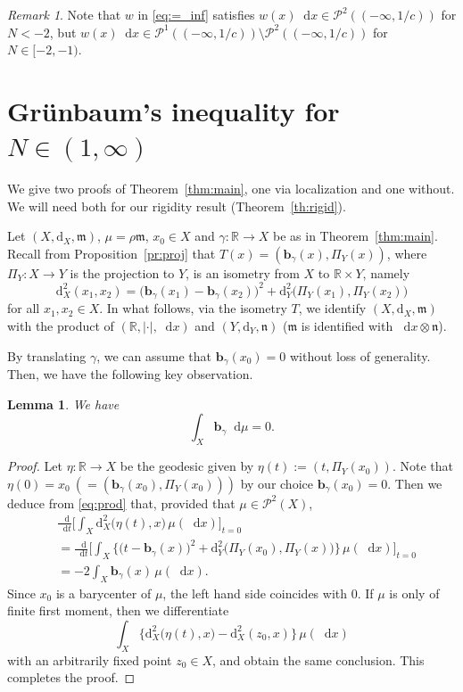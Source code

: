 \documentclass[sts]{imsart}
\newtheorem{lemma}[theorem]{Lemma}
\theoremstyle{definition}
\theoremstyle{remark}
\newtheorem{remark}[theorem]{Remark}
\newcommand{\R}{\mathbb{R}}
\newcommand{\bb}{\mathbf{b}}
\newcommand{\fm}{\mathfrak{m}}
\newcommand{\fn}{\mathfrak{n}}
\newcommand{\dist}{\mathrm{d}}
\newcommand{\lra}{\longrightarrow}
\newcommand*\diff{\mathop{}\!\mathrm{d}}
\begin{document}
\begin{remark}\label{rm:L2}
Note that $w$ in \eqref{eq:=_inf} satisfies $w(x) \diff x \in \mathcal{P}^2((-\infty,1/c))$ for $N<-2$, but $w(x) \diff x \in \mathcal{P}^1((-\infty,1/c)) \setminus \mathcal{P}^2((-\infty,1/c))$ for $N \in [-2,-1)$.
\end{remark}

\section{Gr\"{u}nbaum’s inequality for $N \in (1,\infty)$}\label{sc:proof}%

We give two proofs of Theorem~\ref{thm:main}, one via localization and one without.
We will need both for our rigidity result (Theorem~\ref{th:rigid}).

Let $(X,\dist_X,\fm)$, $\mu=\rho\fm$, $x_0 \in X$ and $\gamma\colon \R \lra X$ be as in Theorem~\ref{thm:main}.
Recall from Proposition~\ref{pr:proj} that $T(x)=(\bb_\gamma(x),\Pi_Y(x))$, where $\Pi_Y \colon X\lra Y$ is the projection to $Y$, is an isometry from $X$ to $\R \times Y$, namely
\begin{equation}\label{eq:prod}
\dist_X^2(x_1,x_2) =\bigl( \bb_{\gamma}(x_1)-\bb_{\gamma}(x_2) \bigr)^2 +\dist_Y^2\bigl( \Pi_Y(x_1),\Pi_Y(x_2) \bigr)
\end{equation}
for all $x_1,x_2\in X$.
In what follows, via the isometry $T$, we identify $(X,\dist_X,\fm)$ with the product of $(\R,|\cdot|,\diff x)$ and $(Y,\dist_Y,\fn)$ ($\fm$ is identified with $\diff x\otimes \fn$).

By translating $\gamma$, we can assume that $\bb_{\gamma}(x_0)=0$ without loss of generality.
Then, we have the following key observation.

\begin{lemma}\label{lm:0mean}
We have
\[ \int_X \bb_{\gamma} \diff \mu=0. \]
\end{lemma}

\begin{proof}
Let $\eta\colon \R \lra X$ be the geodesic given by $\eta(t):=(t,\Pi_Y(x_0))$.
Note that $\eta(0)=x_0\ (=(\bb_\gamma(x_0),\Pi_Y(x_0)))$ by our choice $\bb_{\gamma}(x_0)=0$.
Then we deduce from \eqref{eq:prod} that, provided that $\mu \in \mathcal{P}^2(X)$,
\begin{align*}
&\frac{\diff}{\diff t} \biggl[ \int_X \dist_X^2 \bigl( \eta(t),x \bigr) \,\mu(\diff x) \biggr]_{t=0} \\
&= \frac{\diff}{\diff t} \biggl[ \int_X \bigl\{ \bigl( t-\bb_{\gamma}(x) \bigr)^2 +\dist_Y^2 \bigl( \Pi_Y(x_0),\Pi_Y(x) \bigr) \bigr\} \,\mu(\diff x) \biggr]_{t=0} \\
&= -2 \int_X \bb_{\gamma}(x) \,\mu(\diff x).
\end{align*}
Since $x_0$ is a barycenter of $\mu$, the left hand side coincides with $0$.
If $\mu$ is only of finite first moment, then we differentiate
\[
\int_X \bigl\{ \dist_X^2\bigl( \eta(t),x \bigr) -\dist_X^2(z_0,x) \bigr\} \,\mu(\diff x)
\]
with an arbitrarily fixed point $z_0 \in X$, and obtain the same conclusion.
This completes the proof.
\end{proof}
\end{document}
